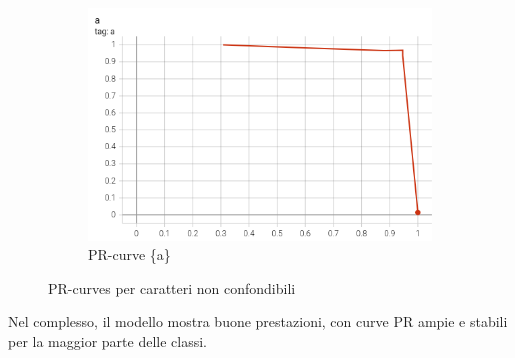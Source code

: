 \begin{figure}[htbp]
\begin{subfigure}[t]{0.32\textwidth}
        \includegraphics[width=\textwidth]{images/pr_curve3.png}
        \caption{PR-curve \{a\}}
    \end{subfigure}
    \caption{PR-curves per caratteri non confondibili}
    \label{fig:pr_curves}
\end{figure}

Nel complesso, il modello mostra buone prestazioni, con curve PR ampie e stabili per la maggior parte delle classi.

